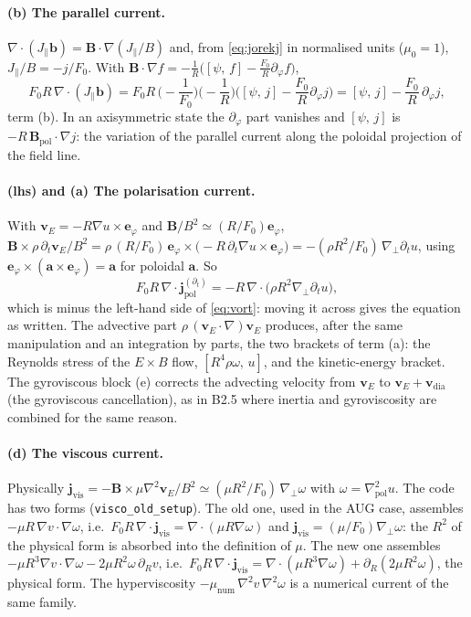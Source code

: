 \documentclass[11pt,a4paper]{article}
\newcommand{\bB}{\mathbf{B}}
\newcommand{\bv}{\mathbf{v}}
\newcommand{\bb}{\mathbf{b}}
\newcommand{\ephi}{\mathbf{e}_\varphi}
\newcommand{\gradp}{\nabla_{\!\perp}}
\newcommand{\divg}{\nabla\!\cdot\!}
\newcommand{\Jpar}{J_\parallel}
\newcommand{\jpol}{\mathbf{j}_{\mathrm{pol}}}
\newcommand{\jvis}{\mathbf{j}_{\mathrm{vis}}}
\newcommand{\pb}[2]{\left[#1,\,#2\right]}
\newcommand{\code}[1]{\texttt{#1}}
\newcommand{\vE}{\mathbf{v}_E}
\begin{document}
\paragraph{(b) The parallel current.}
$\divg(\Jpar\bb) = \bB\cdot\nabla(\Jpar/B)$ and, from \eqref{eq:jorekj} in normalised units ($\mu_0 = 1$),
$\Jpar/B = -j/F_0$. With $\bB\cdot\nabla f = -\tfrac1R\big(\pb{\psi}{f} - \tfrac{F_0}{R}\partial_\varphi f\big)$,
\begin{equation}
  F_0 R\,\divg(\Jpar\bb) = F_0 R\,\Big(-\frac{1}{F_0}\Big)\Big(-\frac1R\Big)\Big(\pb{\psi}{j} - \frac{F_0}{R}\partial_\varphi j\Big)
  = \pb{\psi}{j} - \frac{F_0}{R}\,\partial_\varphi j ,
  \label{eq:bterm}
\end{equation}
term (b). In an axisymmetric state the $\partial_\varphi$ part vanishes and $\pb{\psi}{j}$ is $-R\,\bB_{\mathrm{pol}}\cdot\nabla j$:
the variation of the parallel current along the poloidal projection of the field line.

\paragraph{(lhs) and (a) The polarisation current.}
With $\vE = -R\nabla u\times\ephi$ and $\bB/B^2\simeq(R/F_0)\ephi$,
$\bB\times\rho\,\partial_t\vE/B^2 = \rho\,(R/F_0)\,\ephi\times\big(-R\,\partial_t\nabla u\times\ephi\big)
= -(\rho R^2/F_0)\,\gradp\partial_t u$, using $\ephi\times(\mathbf{a}\times\ephi) = \mathbf{a}$ for poloidal $\mathbf{a}$. So
\begin{equation}
  F_0 R\,\divg\jpol^{(\partial_t)} = -R\,\divg\big(\rho R^2\gradp\partial_t u\big),
  \label{eq:lhsterm}
\end{equation}
which is minus the left-hand side of \eqref{eq:vort}: moving it across gives the equation as written. The advective
part $\rho\,(\vE\cdot\nabla)\vE$ produces, after the same manipulation and an integration by parts, the two brackets of
term (a): the Reynolds stress of the $E\times B$ flow, $\pb{R^4\rho\omega}{u}$, and the kinetic-energy bracket. The
gyroviscous block (e) corrects the advecting velocity from $\vE$ to $\vE + \bv_{\mathrm{dia}}$ (the gyroviscous
cancellation), as in B2.5 where inertia and gyroviscosity are combined for the same reason.

\paragraph{(d) The viscous current.}
Physically $\jvis = -\bB\times\mu\nabla^2\vE/B^2 \simeq (\mu R^2/F_0)\,\gradp\omega$ with $\omega = \nabla^2_{\mathrm{pol}}u$.
The code has two forms (\code{visco\_old\_setup}). The old one, used in the AUG case, assembles
$-\mu R\,\nabla v\!\cdot\!\nabla\omega$, i.e.\ $F_0R\,\divg\jvis = \divg(\mu R\nabla\omega)$ and
$\jvis = (\mu/F_0)\gradp\omega$: the $R^2$ of the physical form is absorbed into the definition of $\mu$. The new one
assembles $-\mu R^3\nabla v\!\cdot\!\nabla\omega - 2\mu R^2\omega\,\partial_R v$, i.e.\
$F_0R\,\divg\jvis = \divg(\mu R^3\nabla\omega) + \partial_R(2\mu R^2\omega)$, the physical form. The hyperviscosity
$-\mu_{\mathrm{num}}\,\nabla^2 v\,\nabla^2\omega$ is a numerical current of the same family.
\end{document}
